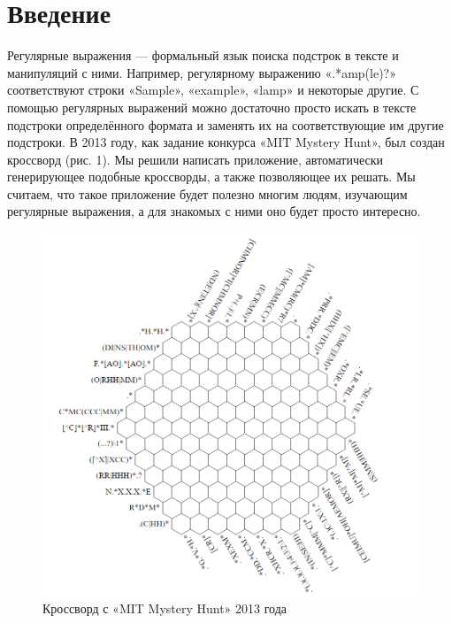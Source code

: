 \documentclass[12pt]{article}
\begin{document}
\section{Введение}
Регулярные выражения — формальный язык поиска подстрок в тексте и манипуляций с ними. Например, регулярному выражению «.*amp(le)?» соответствуют строки «Sample», «example», «lamp» и некоторые другие. С помощью регулярных выражений можно достаточно просто искать в тексте подстроки определённого формата и заменять их на соответствующие им другие подстроки. В 2013 году, как задание конкурса «MIT Mystery Hunt», был создан кроссворд (рис. 1). Мы решили написать приложение, автоматически генерирующее подобные кроссворды, а также позволяющее их решать. Мы считаем, что такое приложение будет полезно многим людям, изучающим регулярные выражения, а для знакомых с ними оно будет просто интересно.
\begin{figure}[ht!]
    \includegraphics[width=1.0\textwidth]{MITHexagon.png}
    \caption{Кроссворд с «MIT Mystery Hunt» 2013 года}
\end{figure}

    \newpage %

    \newpage %
\end{document}
